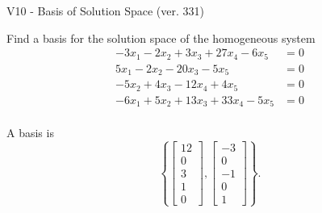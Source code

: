 \begin{exercise}
  \begin{exerciseTitle}V10 - Basis of Solution Space (ver. 331)\end{exerciseTitle}
  \begin{exerciseStatement}
    Find a basis for the solution space of the homogeneous system 
\begin{align*}
 -3 x_ 1 -2 x_ 2 + 3 x_ 3 + 27 x_ 4 -6 x_ 5 &= 0  \\ 
  5 x_ 1 -2 x_ 2 -20 x_ 3 -5 x_ 5 &= 0  \\ 
  -5 x_ 2 + 4 x_ 3 -12 x_ 4 + 4 x_ 5 &= 0  \\ 
  -6 x_ 1 + 5 x_ 2 + 13 x_ 3 + 33 x_ 4 -5 x_ 5 &= 0  \\ 
 \end{align*}


 
  \end{exerciseStatement}

  \begin{exerciseAnswer}
   A basis is   
\[\left\{\left[\begin{array}{c}
12 \\
0 \\
3 \\
1 \\
0
\end{array}\right] , \left[\begin{array}{c}
-3 \\
0 \\
-1 \\
0 \\
1
\end{array}\right]\right\}.\]

  


  \end{exerciseAnswer}
\end{exercise}